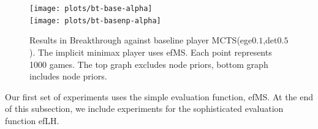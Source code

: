 \documentclass[conference]{IEEEtran}
\begin{document}

\begin{figure}[t]
\begin{center}
\texttt{[image: plots/bt-base-alpha]}\\
\texttt{[image: plots/bt-basenp-alpha]}
\caption{Results in Breakthrough against 
baseline player MCTS(ege$0.1$,det$0.5$). The implicit minimax player uses efMS. 
Each point represents 1000 games. The top graph excludes node priors, bottom graph includes node priors.} 
\label{fig:bt-base-alpha}
\end{center}
\end{figure}

Our first set of experiments uses the simple evaluation function, efMS. At the end of this subsection, we 
include experiments for the sophisticated evaluation function efLH.
\end{document}
